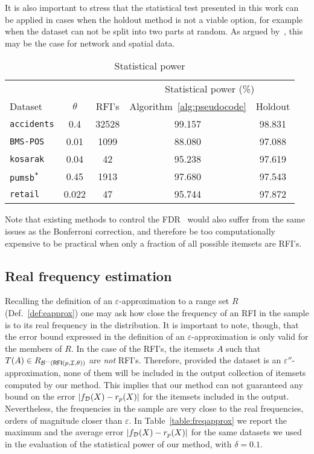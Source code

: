 It is also important to stress that the statistical test presented in this work
can be applied in cases when the holdout method is not a viable option, for
example when the dataset can not be split into two parts at random. As argued
by~\citet{Hanhijarvi11}, this may be the case for network and spatial data.

\begin{table}[tb]
\centering
\begin{tabular}{lcccc}
\toprule
& & & \multicolumn{2}{c}{Statistical power (\%)} \\
\cmidrule(l){4-5}
Dataset & $\theta$ & RFI's & Algorithm~\ref{alg:pseudocode} & Holdout\\
\midrule
\texttt{accidents} & 0.4 & 32528 & 99.157 & 98.831\\
\texttt{BMS-POS} & 0.01 & 1099 & 88.080 & 97.088 \\
\texttt{kosarak} & 0.04 & 42 & 95.238 & 97.619 \\
\texttt{pumsb\textsuperscript{*}} & 0.45 & 1913 & 97.680 & 97.543 \\
\texttt{retail} & 0.022 & 47 & 95.744 & 97.872\\
\bottomrule
\end{tabular}
\caption{Statistical power}
\label{table:power}
\end{table}


Note that existing methods to control the FDR~\citep{BenjaminiH95}
would also suffer from the same issues as the Bonferroni correction, and
therefore be too computationally expensive to be practical when only a fraction
of all possible itemsets are RFI's.

\subsection{Real frequency estimation}
Recalling the definition of an $\varepsilon$-approximation to a range set
$R$ (Def.~\ref{def:eapprox}) one may ask how close the frequency of
an RFI in the sample is to its real frequency in the distribution. It is
important to note, though, that the error bound expressed in the definition of
an $\varepsilon$-approximation is only valid for the members of $R$. In the case
of the RFI's, the itemsets $A$ such that $T(A)\in
R_{\mathcal{B}^-(\mathsf{RFI}(p,{\cal I},\theta))}$ are \emph{not} RFI's. Therefore, provided
the dataset is an $\varepsilon''$-approximation, none of them will be included
in the output collection of itemsets computed by our method. This implies that
our method can not guaranteed any bound on the error $|f_{\cal D}(X)-r_p(X)|$ for the
itemsets included in the output. Nevertheless, the frequencies in the sample are
very close to the real frequencies, orders of magnitude closer than
$\varepsilon$. In Table~\ref{table:freqapprox} we report the maximum and the
average error $|f_{\cal D}(X)-r_p(X)|$ for the same datasets we used in the
evaluation of the statistical power of our method, with $\delta=0.1$.


